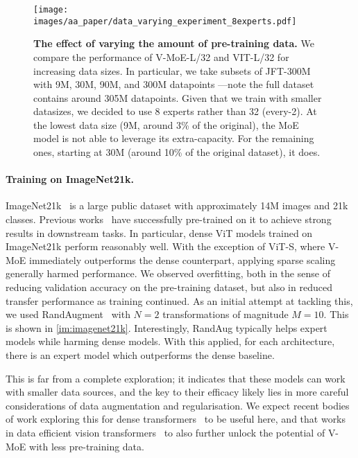 \documentclass{article}
\newcommand{\abbv}{{V-MoE}}
\begin{document}
\begin{figure}[h]
\centering
\texttt{[image: images/aa\_paper/data\_varying\_experiment\_8experts.pdf]}
\caption{\textbf{The effect of varying the amount of pre-training data.}
We compare the performance of \abbv{}-L/32 and VIT-L/32 for increasing data sizes.
In particular, we take subsets of JFT-300M with 9M, 30M, 90M, and 300M datapoints ---note the full dataset contains around 305M datapoints.
Given that we train with smaller datasizes, we decided to use 8 experts rather than 32 (every-2).
At the lowest data size (9M, around 3\% of the original), the MoE model is not able to leverage its extra-capacity.
For the remaining ones, starting at 30M (around 10\% of the original dataset), it does.
}
\label{im:data_efficiency}
\end{figure}


\paragraph{Training on ImageNet21k.}
ImageNet21k~\cite{deng2009imagenet} is a large public dataset with approximately 14M images and 21k classes. Previous works~\cite{dosovitskiy2020image,kolesnikov2019big} have successfully pre-trained on it to achieve strong results in downstream tasks. In particular, dense ViT models trained on ImageNet21k perform reasonably well.
With the exception of ViT-S, where \abbv{} immediately outperforms the dense counterpart, applying sparse scaling generally harmed performance. We observed overfitting, both in the sense of reducing validation accuracy on the pre-training dataset, but also in reduced transfer performance as training continued. As an initial attempt at tackling this, we used RandAugment~\cite{randaug2020cubuk} with $N=2$ transformations of magnitude $M=10$. This is shown in \cref{im:imagenet21k}. Interestingly, RandAug typically helps expert models while harming dense models. With this applied, for each architecture, there is an expert model which outperforms the dense baseline.

This is far from a complete exploration; it indicates that these models can work with smaller data sources, and the key to their efficacy likely lies in more careful considerations of data augmentation and regularisation. We expect recent bodies of work exploring this for dense transformers~\cite{jiang2021token,touvron2021cait} to be useful here, and that works in data efficient vision transformers~\cite{touvron2020deit,yuan2021tokens} to also further unlock the potential of \abbv{} with less pre-training data.
\end{document}
